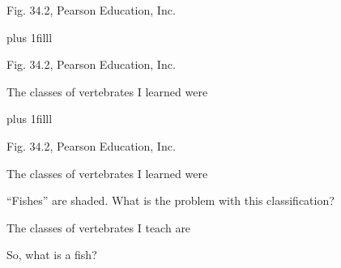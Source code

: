 \documentclass[t,handout]{beamer}  %
\newcommand{\btVFill}{\vskip0pt plus 1filll}
\begin{document}
%
{
\begin{frame}[b]

	\tiny Fig. 34.2, \textcopyright Pearson Education, Inc.
\end{frame}
}
%
%
{
\begin{frame}[t]{}

	
	\btVFill
	
	\tiny Fig. 34.2, \tiny \textcopyright Pearson Education, Inc.
\end{frame}
}
%
{
\begin{frame}[t]{The classes of vertebrates I learned were}

	\vskip0pt plus 1filll
	
	\tiny Fig. 34.2, \tiny \textcopyright Pearson Education, Inc.
\end{frame}
}
%
{
\begin{frame}[t]{The classes of vertebrates I learned were}

	\vspace*{-0.5\baselineskip}
	
	\hangpara “Fishes” are shaded. What is the problem with this classification?
		
\end{frame}
}
{
\begin{frame}[t]{The classes of vertebrates I teach are}

	\vspace*{-0.5\baselineskip}
	
	\hangpara So, what is a fish? \alt<handout>{}{\pause \highlight{You are!}}
	
\end{frame}
}
\end{document}
